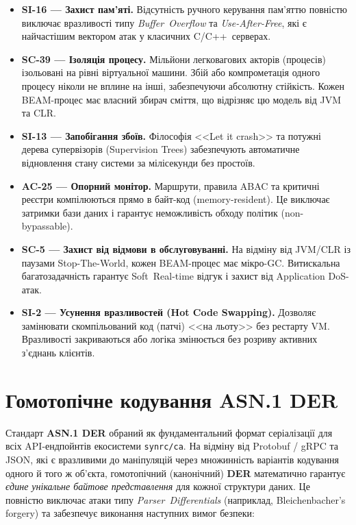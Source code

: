 \begin{itemize}
    \item \textbf{SI-16 — Захист пам'яті.} Відсутність ручного керування пам'яттю повністю
          виключає вразливості типу \emph{Buffer~Overflow} та \emph{Use-After-Free}, які є
          найчастішим вектором атак у класичних C/C++\, серверах.

    \item \textbf{SC-39 — Ізоляція процесу.} Мільйони легковагових акторів (процесів) ізольовані
          на рівні віртуальної машини. Збій або компрометація одного процесу ніколи не вплине на
          інші, забезпечуючи абсолютну стійкість. Кожен BEAM-процес має власний збирач сміття,
          що відрізняє цю модель від JVM та CLR.

    \item \textbf{SI-13 — Запобігання збоїв.} Філософія <<Let it crash>> та потужні дерева
          супервізорів (Supervision Trees) забезпечують автоматичне відновлення стану системи
          за мілісекунди без простоїв.

    \item \textbf{AC-25 — Опорний монітор.} Маршрути, правила ABAC та критичні реєстри
          компілюються прямо в байт-код (memory-resident). Це виключає затримки бази даних і
          гарантує неможливість обходу політик (non-bypassable).

    \item \textbf{SC-5 — Захист від відмови в обслуговуванні.} На відміну від JVM/CLR із
          паузами Stop-The-World, кожен BEAM-процес має мікро-GC. Витискальна багатозадачність
          гарантує Soft~Real-time відгук і захист від Application DoS-атак.

    \item \textbf{SI-2 — Усунення вразливостей (Hot Code Swapping).} Дозволяє замінювати
          скомпільований код (патчі) <<на льоту>> без рестарту VM. Вразливості закриваються або
          логіка змінюється без розриву активних з'єднань клієнтів.
\end{itemize}

\section{Гомотопічне кодування ASN.1 DER}

Стандарт \textbf{ASN.1 DER} обраний як фундаментальний формат серіалізації для всіх
API-ендпойнтів екосистеми \texttt{synrc/ca}. На відміну від Protobuf / gRPC та JSON, які
є вразливими до маніпуляцій через множинність варіантів кодування одного й того ж об'єкта,
гомотопічний (канонічний) \textbf{DER} математично гарантує \emph{єдине унікальне байтове
представлення} для кожної структури даних. Це повністю виключає атаки типу
\emph{Parser~Differentials} (наприклад, Bleichenbacher's forgery) та забезпечує виконання
наступних вимог безпеки:

